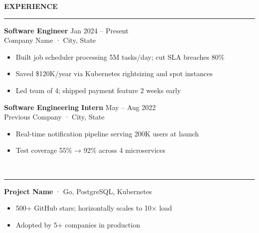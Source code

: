 \documentclass[10pt, a4paper]{article}
\begin{document}
\begin{minipage}[t]{0.67\textwidth}
\vspace{14pt}
\hspace{12pt}

{\small\textbf{EXPERIENCE}}\\[-4pt]
\hspace{12pt}\rule{0.9\textwidth}{0.3pt}

\vspace{4pt}
\hspace{12pt}
\begin{minipage}{0.88\textwidth}
\textbf{Software Engineer} \hfill {\footnotesize\color{lightgray} Jan 2024 -- Present}\\
{\footnotesize\color{lightgray} Company Name · City, State}
\begin{itemize}[leftmargin=1.2em, noitemsep, topsep=3pt]
  \item{\footnotesize Built job scheduler processing 5M tasks/day; cut SLA breaches 80\%}
  \item{\footnotesize Saved \$120K/year via Kubernetes rightsizing and spot instances}
  \item{\footnotesize Led team of 4; shipped payment feature 2 weeks early}
\end{itemize}

\vspace{5pt}
\textbf{Software Engineering Intern} \hfill {\footnotesize\color{lightgray} May -- Aug 2022}\\
{\footnotesize\color{lightgray} Previous Company · City, State}
\begin{itemize}[leftmargin=1.2em, noitemsep, topsep=3pt]
  \item{\footnotesize Real-time notification pipeline serving 200K users at launch}
  \item{\footnotesize Test coverage 55\% → 92\% across 4 microservices}
\end{itemize}
\end{minipage}

\vspace{10pt}
\\[-4pt]
\hspace{12pt}\rule{0.9\textwidth}{0.3pt}

\vspace{4pt}
\hspace{12pt}
\begin{minipage}{0.88\textwidth}
\textbf{Project Name} {\footnotesize\color{lightgray} · Go, PostgreSQL, Kubernetes}\\
\begin{itemize}[leftmargin=1.2em, noitemsep, topsep=2pt]
  \item{\footnotesize 500+ GitHub stars; horizontally scales to 10× load}
  \item{\footnotesize Adopted by 5+ companies in production}
\end{itemize}
\end{minipage}


\end{minipage}
\end{document}

